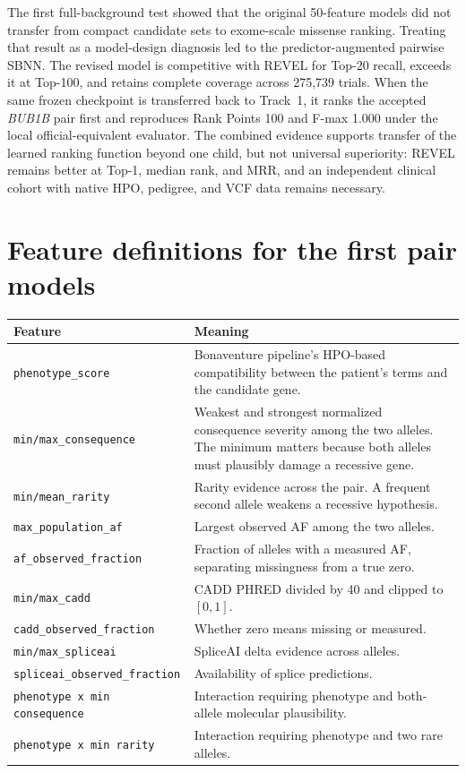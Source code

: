 \documentclass[11pt]{article}
\newcommand{\code}[1]{\texttt{#1}}
\begin{document}
The first full-background test showed that the original 50-feature models did not transfer from compact candidate sets to exome-scale missense ranking. Treating that result as a model-design diagnosis led to the predictor-augmented pairwise SBNN. The revised model is competitive with REVEL for Top-20 recall, exceeds it at Top-100, and retains complete coverage across 275,739 trials. When the same frozen checkpoint is transferred back to Track~1, it ranks the accepted \textit{BUB1B} pair first and reproduces Rank Points 100 and F-max 1.000 under the local official-equivalent evaluator. The combined evidence supports transfer of the learned ranking function beyond one child, but not universal superiority: REVEL remains better at Top-1, median rank, and MRR, and an independent clinical cohort with native HPO, pedigree, and VCF data remains necessary.

\appendix
\section{Feature definitions for the first pair models}

\small
\begin{longtable}{p{}p{}}
\toprule
Feature & Meaning \\
\midrule
\code{phenotype\_score} & Bonaventure pipeline's HPO-based compatibility between the patient's terms and the candidate gene. \\
\code{min/max\_consequence} & Weakest and strongest normalized consequence severity among the two alleles. The minimum matters because both alleles must plausibly damage a recessive gene. \\
\code{min/mean\_rarity} & Rarity evidence across the pair. A frequent second allele weakens a recessive hypothesis. \\
\code{max\_population\_af} & Largest observed AF among the two alleles. \\
\code{af\_observed\_fraction} & Fraction of alleles with a measured AF, separating missingness from a true zero. \\
\code{min/max\_cadd} & CADD PHRED divided by 40 and clipped to $[0,1]$. \\
\code{cadd\_observed\_fraction} & Whether zero means missing or measured. \\
\code{min/max\_spliceai} & SpliceAI delta evidence across alleles. \\
\code{spliceai\_observed\_fraction} & Availability of splice predictions. \\
\code{phenotype x min consequence} & Interaction requiring phenotype and both-allele molecular plausibility. \\
\code{phenotype x min rarity} & Interaction requiring phenotype and two rare alleles. \\
\bottomrule
\end{longtable}
\normalsize
\end{document}

